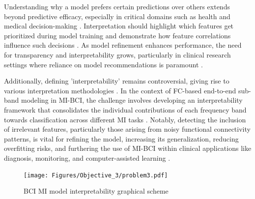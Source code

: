 Understanding why a model prefers certain predictions over others extends beyond predictive efficacy, especially in critical domains such as health and medical decision-making \cite{miotto2018deep}. Interpretation should highlight which features get prioritized during model training and demonstrate how feature correlations influence such decisions \cite{zeiler2014visualizing, chakraborty2017interpretability}. As model refinement enhances performance, the need for transparency and interpretability grows, particularly in clinical research settings where reliance on model recommendations is paramount \cite{xiao2018opportunities}.

Additionally, defining 'interpretability' remains controversial, giving rise to various interpretation methodologies \cite{fan2021interpretability}. In the context of FC-based end-to-end sub-band modeling in MI-BCI, the challenge involves developing an interpretability framework that consolidates the individual contributions of each frequency band towards classification across different MI tasks \cite{zuk2020eeg}. Notably, detecting the inclusion of irrelevant features, particularly those arising from noisy functional connectivity patterns, is vital for refining the model, increasing its generalization, reducing overfitting risks, and furthering the use of MI-BCI within clinical applications like diagnosis, monitoring, and computer-assisted learning \cite{qian2018brain}.


\begin{figure}[!h]
    \centering
    \texttt{[image: Figures/Objective\_3/problem3.pdf]}
    \caption{BCI MI model interpretability graphical scheme}\label{fig:problem_3}
\end{figure}